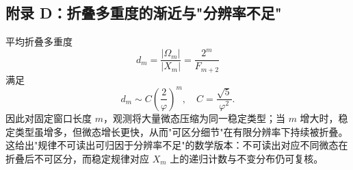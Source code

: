 \subsection{附录 D：折叠多重度的渐近与"分辨率不足"}

平均折叠多重度
\[
d_m=\frac{|\Omega_m|}{|X_m|}=\frac{2^m}{F_{m+2}}
\]
满足
\[
d_m\sim C\left(\frac{2}{\varphi}\right)^m,\quad C=\frac{\sqrt5}{\varphi^2}.
\]
因此对固定窗口长度 $m$，观测将大量微态压缩为同一稳定类型；当 $m$ 增大时，稳定类型虽增多，但微态增长更快，从而"可区分细节"在有限分辨率下持续被折叠。这给出"规律不可读出可归因于分辨率不足"的数学版本：不可读出对应不同微态在折叠后不可区分，而稳定规律对应 $X_m$ 上的递归计数与不变分布仍可复核。
